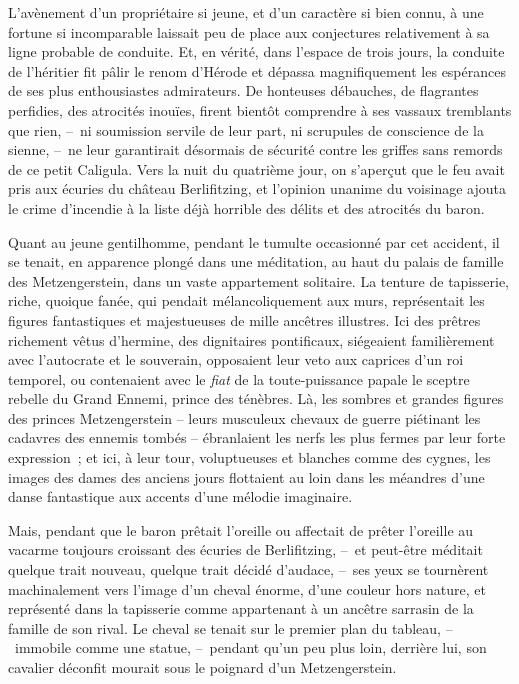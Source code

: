\documentclass[french,twoside]{book} %
\begin{document}
L’avènement d’un propriétaire si jeune, et d’un caractère si bien connu, à une fortune si incomparable laissait peu de place aux conjectures relativement à sa ligne probable de conduite. Et, en vérité, dans l’espace de trois jours, la conduite de l’héritier fit pâlir le renom d’Hérode et dépassa magnifiquement les espérances de ses plus enthousiastes admirateurs. De honteuses débauches, de flagrantes perfidies, des atrocités inouïes, firent bientôt comprendre à ses vassaux tremblants que rien, – ni soumission servile de leur part, ni scrupules de conscience de la sienne, – ne leur garantirait désormais de sécurité contre les griffes sans remords de ce petit Caligula. Vers la nuit du quatrième jour, on s’aperçut que le feu avait pris aux écuries du château Berlifitzing, et l’opinion unanime du voisinage ajouta le crime d’incendie à la liste déjà horrible des délits et des atrocités du baron.\par
Quant au jeune gentilhomme, pendant le tumulte occasionné par cet accident, il se tenait, en apparence plongé dans une méditation, au haut du palais de famille des Metzengerstein, dans un vaste appartement solitaire. La tenture de tapisserie, riche, quoique fanée, qui pendait mélancoliquement aux murs, représentait les figures fantastiques et majestueuses de mille ancêtres illustres. Ici des prêtres richement vêtus d’hermine, des dignitaires pontificaux, siégeaient familièrement avec l’autocrate et le souverain, opposaient leur veto aux caprices d’un roi temporel, ou contenaient avec le \emph{fiat} de la toute-puissance papale le sceptre rebelle du Grand Ennemi, prince des ténèbres. Là, les sombres et grandes figures des princes Metzengerstein – leurs musculeux chevaux de guerre piétinant les cadavres des ennemis tombés – ébranlaient les nerfs les plus fermes par leur forte expression ; et ici, à leur tour, voluptueuses et blanches comme des cygnes, les images des dames des anciens jours flottaient au loin dans les méandres d’une danse fantastique aux accents d’une mélodie imaginaire.\par
Mais, pendant que le baron prêtait l’oreille ou affectait de prêter l’oreille au vacarme toujours croissant des écuries de Berlifitzing, – et peut-être méditait quelque trait nouveau, quelque trait décidé d’audace, – ses yeux se tournèrent machinalement vers l’image d’un cheval énorme, d’une couleur hors nature, et représenté dans la tapisserie comme appartenant à un ancêtre sarrasin de la famille de son rival. Le cheval se tenait sur le premier plan du tableau, – immobile comme une statue, – pendant qu’un peu plus loin, derrière lui, son cavalier déconfit mourait sous le poignard d’un Metzengerstein.\par
\end{document}
